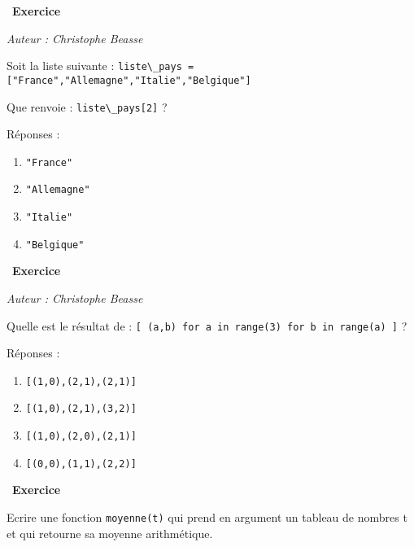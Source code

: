 \documentclass[
  11pt,
]{article}
\newcommand{\passthrough}[1]{#1}
\providecommand{\tightlist}{%
  \setlength{\itemsep}{0pt}\setlength{\parskip}{0pt}}
\newcounter{exo}
\newenvironment{exercice}[1]
{\par \medskip   \addtocounter{exo}{1} \noindent  
\begin{bclogo}[arrondi =0.1,   noborder = true, logo=\bccrayon, marge=4]{~\textbf{Exercice} \textbf{\theexo} {\itshape #1} }  \par}
{
\end{bclogo}
 \par \bigskip }
\newcounter{def}
\begin{document}
\begin{exercice}{}

\emph{Auteur : Christophe Beasse}

Soit la liste suivante :
\passthrough{\lstinline!liste\_pays = ["France","Allemagne","Italie","Belgique"]!}

Que renvoie : \passthrough{\lstinline!liste\_pays[2]!} ?

Réponses :

\begin{enumerate}
\def\labelenumi{\arabic{enumi}.}
\tightlist
\item
  \passthrough{\lstinline!"France"!}
\item
  \passthrough{\lstinline!"Allemagne"!}
\item
  \passthrough{\lstinline!"Italie"!}
\item
  \passthrough{\lstinline!"Belgique"!}
\end{enumerate}

\end{exercice}

\begin{exercice}{}

\emph{Auteur : Christophe Beasse}

Quelle est le résultat de :
\passthrough{\lstinline![ (a,b) for a in range(3) for b in range(a) ]!}
?

Réponses :

\begin{enumerate}
\def\labelenumi{\arabic{enumi}.}
\tightlist
\item
  \passthrough{\lstinline![(1,0),(2,1),(2,1)]!}
\item
  \passthrough{\lstinline![(1,0),(2,1),(3,2)]!}
\item
  \passthrough{\lstinline![(1,0),(2,0),(2,1)]!}
\item
  \passthrough{\lstinline![(0,0),(1,1),(2,2)]!}
\end{enumerate}

\end{exercice}

\begin{exercice}{}

Ecrire une fonction \passthrough{\lstinline!moyenne(t)!} qui prend en
argument un tableau de nombres t et qui retourne sa moyenne
arithmétique.

\end{exercice}
\end{document}
